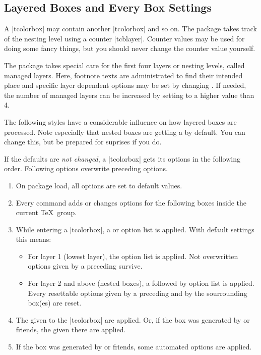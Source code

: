 \clearpage
\subsection{Layered Boxes and Every Box Settings}\label{subsec:everybox}
A |tcolorbox| may contain another |tcolorbox| and so on. The package
takes track of the nesting level using a counter |tcblayer|. Counter values
may be used for doing some fancy things, but you should never change
the counter value yourself.

The package takes special care for the first four layers or nesting levels,
called managed layers.
Here, footnote texts are administrated to find their intended place
and specific layer dependent options may be set by changing
.
If needed, the number of managed layers can be increased by setting
 to a higher value than 4.

The following styles have a considerable influence on how layered boxes
are processed. Note especially that nested boxes are getting a
 by default. You can change this, but be prepared for
suprises if you do.

If the defaults are \emph{not changed}, a |tcolorbox| gets its options
in the following order. Following options overwrite preceding options.
\begin{enumerate}
\item On package load, all options are set to default values.
\item Every  command adds or changes options for the following boxes
  inside the current \TeX\ group.
\item While entering a |tcolorbox|, a  or
   option list is applied.
  With default settings this means:
  \begin{itemize}
  \item For layer 1 (lowest layer), the  option list is applied.
    Not overwritten options given by a preceding  survive.
  \item For layer 2 and above (nested boxes), a  followed by
     option list is applied.
    Every resettable options given by a preceding 
    and by the sourrounding box(es) are reset.
  \end{itemize}
\item The  given to the |tcolorbox| are applied.
  Or, if the box was generated by  or friends,
  the  given there are applied.
\item If the box was generated by  or friends,
  some automated options are applied.
\end{enumerate}


